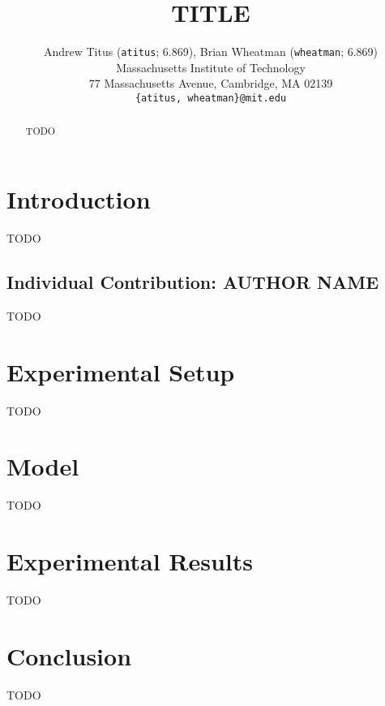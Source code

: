 \documentclass[10pt,twocolumn,letterpaper]{article}
\begin{document}
\title{TITLE}

\author{Andrew Titus (\texttt{atitus}; 6.869), Brian Wheatman (\texttt{wheatman}; 6.869)\\
Massachusetts Institute of Technology\\
77 Massachusetts Avenue, Cambridge, MA 02139\\
{\tt\small \{atitus, wheatman\}@mit.edu}
}

\maketitle

\begin{abstract}
TODO
\end{abstract}

\section{Introduction}
\label{introduction}
TODO

\subsection{Individual Contribution: AUTHOR NAME}
\label{individual_contribution}
TODO

\cite{AlexNet}



\section{Experimental Setup}
\label{exp_setup}
TODO



\section{Model}
\label{model}
TODO



\section{Experimental Results}
\label{exp_results}
TODO



\section{Conclusion}
\label{conclusion}
TODO



{\small


}
\end{document}
